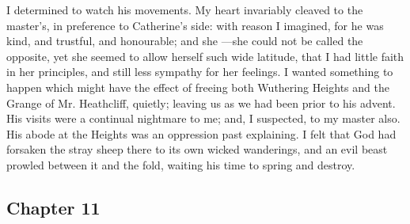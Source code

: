\par I determined to watch his movements. My heart invariably cleaved to the master's, in preference to Catherine's side: with reason I imagined, for he was kind, and trustful, and honourable; and she —she could not be called the opposite, yet she seemed to allow herself such wide latitude, that I had little faith in her principles, and still less sympathy for her feelings. I wanted something to happen which might have the effect of freeing both Wuthering Heights and the Grange of Mr. Heathcliff, quietly; leaving us as we had been prior to his advent. His visits were a continual nightmare to me; and, I suspected, to my master also. His abode at the Heights was an oppression past explaining. I felt that God had forsaken the stray sheep there to its own wicked wanderings, and an evil beast prowled between it and the fold, waiting his time to spring and destroy.










\subsection*{Chapter 11}

